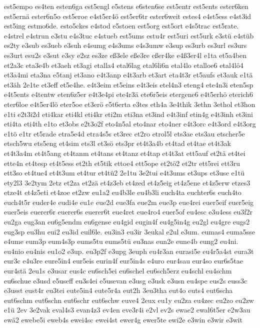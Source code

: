 {est5empo
es4ten
esten6ga
est5engl
e5stens
e6sten6se
est5entr
est5ents
ester6ken
est5ernä
ester6n5o
est5eroe
e4st5er4ö
est5er6tr
ester6weit
estes4
e4st5ess
e4st3id
est5ing
estmo6de.
esto5ckes
e4stod
e5stoen
est5org
est5ort
e4s5trac
est5rate.
e4strel
e4strun
e3stu
e4s3tuc
e4stueb
est5ums
estu4r
est5uri
est5urk
e3stü
e4stüb
es2ty
e3sub
es3ueb
e3suh
e4sumg
e4s3ums
e4s3umw
e3sup
es3urb
es3url
es3urs
es3urt
esu2s
e3sut
e3sy
e2sz
es3ze
eß3ele
eße3re
eßer4ke
e4ß3er4l
e1ta
et5a4ben
et2a3c
eta3e4b
et3aeh
et3agi
etalla4
etal6lag
etal6li6n
etal4lo
etalloe6
etal4lö4
et3a4mi
eta3na
e5tanj
et3ano
e4t3anp
e4t3arb
et3art
eta4t3r
et5aufs
et3auk
e1tä
et3äh
2e1te
et3eff
et5e4he.
e4t3eim
et5eins
e4t3eis
etel4n3
eteng4
ete4n3i
eten5sp
e4t5ents
e4tentw
eten6z5er
e4t3e4pi
ete4r3ä
ete6r5eis
etergene6
e4t5erhö
eterich6
eter6loe
e4t5er4lö
eter5oe
et3erö
e5t6erta
e3tes
eth4a
3e4thik
3ethn
3ethol
et3hon
e1ti
e2t3i2d
eti4kar
eti4kl
eti4kr
eti2m
eti3na
et3ind
e4t3inf
etin4g
e4t3inh
et3ini
eti4ta
eti4th
e1to
et3obs
e2t3o2f
eto4n5al
eto4nar
eto4ner
e4t3orc
e4t3ord
e4t3org
e1tö
e1tr
et5rade
etra5e4d
etra4s5s
et3rec
et2ro
etrol5l
ets3ae
ets3au
etscher5e
etsch5wu
ets5eng
et4sim
ets3l
et3sö
ets3pr
et4t3a4b
et4tad
et4tae
et4t3ak
et4t3a4m
et4t5ang
et4tanm
et4tans
et4tanz
et4tap
et4t3at
ett5auf
et2tä
et4tei
ette4n
et4tesp
et4t5ess
et2th
et5tik
ettoe4
ett5ope
et2tö2
et2tr
ett5rei
ett3ru
ett3so
et4tue4
et4t3um
et4tur
et4tü2
2e1tu
3e2tui
e4t3ums
et3ups
et3use
e1tü
ety2l3
3e2tym
2etz
et2za
et2zä
et4z3eb
et4zed
et4z5eig
et4z5ene
et4z5erw
etzes3
etze4t
et4z5eti
et4zoe
et2zw
eu1a2
eu4b3le
eu4b3li
euch4ta
euchter6s
euch4to
euch4t5r
euder4e
eudi4e
eu1e
eue2d
eue3fa
eue2m
eue3p
eue4rei
euer5eif
euer5eig
euer5eis
euerer6r
euerer6s
euerer6t
eue4ret
eue4ro4
euer5of
eu4esc
e3u4ess
eu3f2r
eu2ga
eug3an
eu6g5endm
eu6gense
eu4gid
eugin4f
eu4g5in4g
eu2gl
eu4gre
eugs2
eug3sp
eu3hu
eui2
eu3id
euil6le.
eu3in3
eu3ir
3eukal
e2ul
e3um.
eumas4
euma5sse
e4ume
eum3p
eum4s3p
eums5tu
eums5tü
eu3nas
eun2e
eune4b
eung2
eu4ni.
eu4nio
eu4nis
eu1o2
e3up.
eu3p2f
e3upg
3euph
eu4r3an
eurasi5e
eu4r5a4st
eura3t
eur3c
e4u3re
eure5in4
eur5eis
eurin4f
eur5in4s
e4uro
eur4sau
eur4so
eur6s5tae
eur4stä
2eu1s
e3usar
eus4c
eu6sch5ei
eu6schel
eu6sch5erz
eu4schl
eu4schm
eu6schue
e3usd
e5useff
eu3s4ei
e5usevan
e3usg
e3usk
e3usn
eu4spe
eus2s
euss3c
e3usst
eust4r
eu3tei
eute5in4
eute5r4a
eut2h
3eu3tha
eut4o
euts4
eut6scha
eut6schm
eut6schn
eut6schr
eut6schw
euve4
2eux
eu1y
eu2za
eu4zec
eu2zo
eu2zw
e1ü
2ev
3e2vak
eval4s3
evan4z3
ev4en
eve3r4i
e2vl
ev2s
ewae2
ewal6t5er
e2w3au
ewä2
ewebe5i
eweb4s
ewei4sc
ewei4st
ewer4g
ewer5te
ewi2e
e3win
e3wir
e3wit
}
